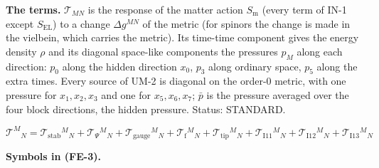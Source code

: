 \documentclass[
  10pt,
]{article}
\begin{document}
\textbf{The terms.} \(\mathcal{T}_{MN}\) is the response of the matter
action \(S_{\mathrm{m}}\) (every term of IN-1 except
\(S_{\mathrm{EL}}\)) to a change \(\Delta g^{MN}\) of the metric (for
spinors the change is made in the vielbein, which carries the metric).
Its time-time component gives the energy density \(\rho\) and its
diagonal space-like components the pressures \(p_M\) along each
direction: \(p_0\) along the hidden direction \(x_0\), \(p_3\) along
ordinary space, \(p_5\) along the extra times. Every source of UM-2 is
diagonal on the order-0 metric, with one pressure for \(x_1, x_2, x_3\)
and one for \(x_5, x_6, x_7\); \(\bar p\) is the pressure averaged over
the four block directions, the hidden pressure. Status: STANDARD.

\[
\mathcal{T}^M{}_N = \mathcal{T}_{\mathrm{stab}}{}^M{}_N + \mathcal{T}_\Psi{}^M{}_N +
 \mathcal{T}_{\mathrm{gauge}}{}^M{}_N
 + \mathcal{T}_{\mathrm{f}}{}^M{}_N + \mathcal{T}_{\mathrm{tip}}{}^M{}_N + \mathcal{T}_{\mathrm{I11}}{}^M{}_N
 + \mathcal{T}_{\mathrm{I12}}{}^M{}_N + \mathcal{T}_{\mathrm{I13}}{}^M{}_N \tag{FE-3}
\]

\textbf{Symbols in (FE-3).}
\end{document}
